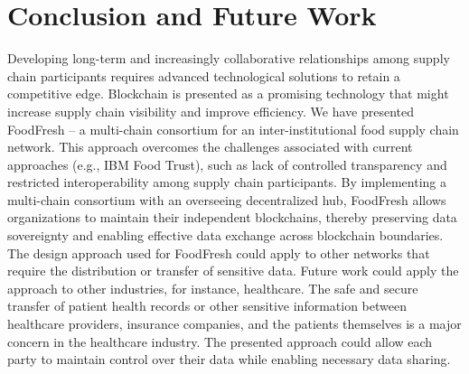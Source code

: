 \documentclass[conference,a4paper,flushend]{neutr}
\begin{document}
\section{Conclusion and Future Work} \label{s:conclusion}
Developing long-term and increasingly collaborative relationships among supply chain participants requires advanced technological solutions to retain a competitive edge. Blockchain is presented as a promising technology that might increase supply chain visibility and improve efficiency.  We have presented FoodFresh -- a multi-chain consortium for an inter-institutional food supply chain network. 
This approach overcomes the challenges associated with current approaches (e.g., IBM Food Trust), such as lack of controlled transparency and restricted interoperability among supply chain participants. By implementing a multi-chain consortium with an overseeing decentralized hub, FoodFresh allows organizations to maintain their independent blockchains, thereby preserving data sovereignty and enabling effective data exchange across blockchain boundaries. 
The design approach used for FoodFresh could apply to other networks that require the distribution or transfer of sensitive data. Future work could apply the approach to other industries, for instance, healthcare. The safe and secure transfer of patient health records or other sensitive information between healthcare providers, insurance companies, and the patients themselves is a major concern in the healthcare industry. The presented approach could allow each party to maintain control over their data while enabling necessary data sharing.


\begingroup
\sloppy
\printbibliography[notcategory=selfref]
\endgroup 
\end{document}
